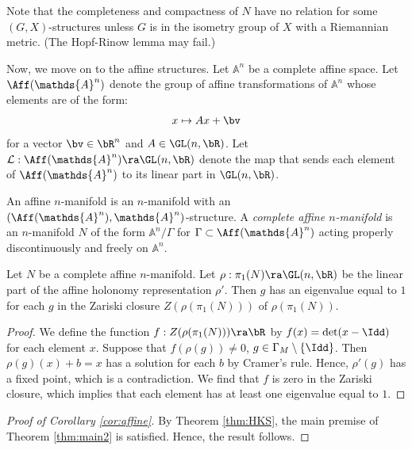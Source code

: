 Note that the completeness and compactness of $N$ have 
no relation for some $(G,X)$-structures 
unless $G$ is in the isometry group of $X$ with a Riemannian metric.
(The Hopf-Rinow lemma may fail.)

Now, we move on to the affine structures. 
Let $\mathds{A}^n$ be a complete affine space. 
	Let $\Aff(\mathds{A}^n)$ denote the group of affine transformations of $\mathds{A}^n$
	whose elements are of the form: 
	\[  x \mapsto A x + \bv   \]
	for a vector $\bv \in \bR^{n}$ and $A \in \GL(n, \bR)$. 
	Let $\mathcal{L}: \Aff(\mathds{A}^n) \ra \GL(n, \bR)$ denote the map that sends each element of $\Aff(\mathds{A}^n)$ to its linear part in $\GL(n, \bR)$.
	
	
	
	
		An affine $n$-manifold is an $n$-manifold with  an $(\Aff(\mathds{A}^n), \mathds{A}^n)$-structure. 
		A {\em complete affine $n$-manifold}
			is an $n$-manifold $N$ of the form $\mathds{A}^n/\Gamma$ for $\Gamma \subset \Aff(\mathds{A}^n)$
			acting properly discontinuously and freely on $\mathds{A}^n$.  
			
			
	\begin{theorem}\label{thm:HKS}
	Let $N$ be a complete affine $n$-manifold.
	Let $\rho:\pi_1(N) \ra \GL(n, \bR)$ be the linear part of the affine holonomy representation $\rho'$.
	Then $g$ has an eigenvalue equal to $1$ for each $g$ in the Zariski closure $Z(\rho(\pi_1(N)))$ of $\rho(\pi_1(N))$. 
\end{theorem}
	\begin{proof} 
		We define the function $f: Z(\rho(\pi_1(N))) \ra \bR$ 
		by $f(x) = \det(x-\Idd)$ for each element $x$. 
		Suppose that $f(\rho(g)) \ne 0$, $g\in \Gamma_M \setminus \{\Idd\}$. Then $\rho(g)(x) + b = x$ has 
		a solution for each $b$ by Cramer's rule. 
		Hence, $\rho'(g)$ has a fixed point, which is a contradiction.
		We find that $f$ is zero in the Zariski closure, 
        which implies that each element has at least one eigenvalue equal to $1$.  
		\end{proof} 



\begin{proof}[Proof of Corollary \ref{cor:affine}] 
By Theorem \ref{thm:HKS}, the main premise of Theorem \ref{thm:main2} is satisfied. 
Hence, the result follows. 
\end{proof} 
	
	



   



